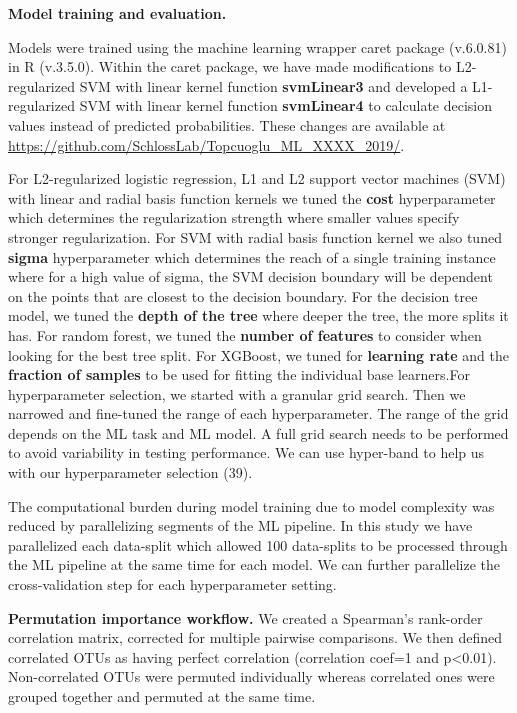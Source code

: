\documentclass[11pt,]{article}
\begin{document}
\textbf{Model training and evaluation.}

Models were trained using the machine learning wrapper caret package
(v.6.0.81) in R (v.3.5.0). Within the caret package, we have made
modifications to L2-regularized SVM with linear kernel function
\textbf{svmLinear3} and developed a L1-regularized SVM with linear
kernel function \textbf{svmLinear4} to calculate decision values instead
of predicted probabilities. These changes are available at
\url{https://github.com/SchlossLab/Topcuoglu_ML_XXXX_2019/}.

For L2-regularized logistic regression, L1 and L2 support vector
machines (SVM) with linear and radial basis function kernels we tuned
the \textbf{cost} hyperparameter which determines the regularization
strength where smaller values specify stronger regularization. For SVM
with radial basis function kernel we also tuned \textbf{sigma}
hyperparameter which determines the reach of a single training instance
where for a high value of sigma, the SVM decision boundary will be
dependent on the points that are closest to the decision boundary. For
the decision tree model, we tuned the \textbf{depth of the tree} where
deeper the tree, the more splits it has. For random forest, we tuned the
\textbf{number of features} to consider when looking for the best tree
split. For XGBoost, we tuned for \textbf{learning rate} and the
\textbf{fraction of samples} to be used for fitting the individual base
learners.For hyperparameter selection, we started with a granular grid
search. Then we narrowed and fine-tuned the range of each
hyperparameter. The range of the grid depends on the ML task and ML
model. A full grid search needs to be performed to avoid variability in
testing performance. We can use hyper-band to help us with our
hyperparameter selection (39).

The computational burden during model training due to model complexity
was reduced by parallelizing segments of the ML pipeline. In this study
we have parallelized each data-split which allowed 100 data-splits to be
processed through the ML pipeline at the same time for each model. We
can further parallelize the cross-validation step for each
hyperparameter setting.

\textbf{Permutation importance workflow.} We created a Spearman's
rank-order correlation matrix, corrected for multiple pairwise
comparisons. We then defined correlated OTUs as having perfect
correlation (correlation coef=1 and p\textless{}0.01). Non-correlated
OTUs were permuted individually whereas correlated ones were grouped
together and permuted at the same time.
\end{document}
